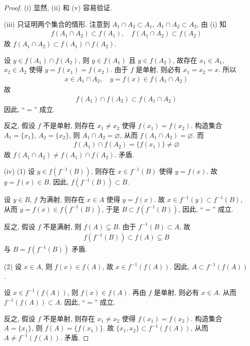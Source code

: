 \documentclass[../../main.tex]{subfiles}
\begin{document}
\begin{proof}
(i) 显然, (ii) 和 (v) 容易验证.

(iii) 只证明两个集合的情形. 注意到 $A_1 \cap A_2 \subset A_1$, $A_1 \cap A_2 \subset A_2$, 由 (i) 知
\begin{align*}
f(A_1 \cap A_2) \subset f(A_1), \quad f(A_1 \cap A_2) \subset f(A_2)
\end{align*}
故 $f(A_1 \cap A_2) \subset f(A_1) \cap f(A_2)$.

设 $y \in f(A_1) \cap f(A_2)$, 则 $y \in f(A_1)$ 且 $y \in f(A_2)$, 故存在 $x_1 \in A_1$, $x_2 \in A_2$ 使得 $y = f(x_1) = f(x_2)$. 由于 $f$ 是单射, 则必有 $x_1 = x_2 = x$. 所以
\begin{align*}
x \in A_1 \cap A_2, \quad y = f(x) \in f(A_1 \cap A_2)
\end{align*}
故
\begin{align*}
f(A_1) \cap f(A_2) \subset f(A_1 \cap A_2)
\end{align*}
因此, “$=$” 成立.

反之, 假设 $f$ 不是单射, 则存在 $x_1 \neq x_2$ 使得 $f(x_1) = f(x_2)$. 构造集合 $A_1 = \{x_1\}$, $A_2 = \{x_2\}$, 则 $A_1 \cap A_2 = \varnothing$, 从而 $f(A_1 \cap A_2) = \varnothing$. 而
\begin{align*}
f(A_1) \cap f(A_2) = \{f(x_1)\} \neq \varnothing
\end{align*}
故 $f(A_1 \cap A_2) \neq f(A_1) \cap f(A_2)$. 矛盾.

(iv) 
(1) 设 $y \in f(f^{-1}(B))$, 则存在 $x \in f^{-1}(B)$ 使得 $y = f(x)$. 故 $y = f(x) \in B$. 因此, $f(f^{-1}(B)) \subset B$.

设 $y \in B$, $f$ 为满射, 则存在 $x \in A$ 使得 $y = f(x)$. 故 $x \in f^{-1}(y) \subset f^{-1}(B)$, 从而 $y = f(x) \in f(f^{-1}(B))$, 于是 $B \subset f(f^{-1}(B))$, 因此, “$=$” 成立.

反之, 假设 $f$ 不是满射, 则 $f(A) \subsetneq B$. 由于 $f^{-1}(B) \subset A$, 故
\begin{align*}
f(f^{-1}(B)) \subset f(A) \subsetneq B
\end{align*}
与 $B = f(f^{-1}(B))$ 矛盾.

(2) 设 $x \in A$, 则 $f(x) \in f(A)$, 故 $x \in f^{-1}(f(A))$. 因此, $A \subset f^{-1}(f(A))$.

设 $x \in f^{-1}(f(A))$, 则 $f(x) \in f(A)$. 再由 $f$ 是单射, 则必有 $x \in A$. 从而 $f^{-1}(f(A)) \subset A$. 因此, “$=$” 成立.

反之, 假设 $f$ 不是单射, 则存在 $x_1 \neq x_2$ 使得 $f(x_1) = f(x_2)$. 构造集合 $A = \{x_1\}$, 则 $f(A) = \{f(x_1)\}$. 故 $\{x_1, x_2\} \subset f^{-1}(f(A))$, 从而 $A \neq f^{-1}(f(A))$. 矛盾. 

\end{proof}
\end{document}
